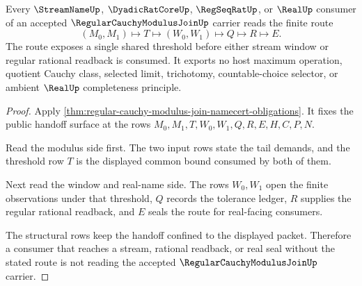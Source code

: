 \begin{theorem}
\label{thm:regular-cauchy-modulus-join-shared-tail-handoff}
Every $\StreamNameUp$, $\DyadicRatCoreUp$, $\RegSeqRatUp$, or $\RealUp$ consumer of an accepted $\RegularCauchyModulusJoinUp$ carrier reads the finite route
$$
(M_0,M_1) \longmapsto T \longmapsto (W_0,W_1) \longmapsto Q \longmapsto R \longmapsto E .
$$
The route exposes a single shared threshold before either stream window or regular rational readback is consumed. It exports no host maximum operation, quotient Cauchy class, selected limit, trichotomy, countable-choice selector, or ambient $\RealUp$ completeness principle.
\end{theorem}
\begin{proof}
Apply \autoref{thm:regular-cauchy-modulus-join-namecert-obligations}. It fixes the public handoff surface at the rows $M_0,M_1,T,W_0,W_1,Q,R,E,H,C,P,N$.

Read the modulus side first. The two input rows state the tail demands, and the threshold row $T$ is the displayed common bound consumed by both of them.

Next read the window and real-name side. The rows $W_0,W_1$ open the finite observations under that threshold, $Q$ records the tolerance ledger, $R$ supplies the regular rational readback, and $E$ seals the route for real-facing consumers.

The structural rows keep the handoff confined to the displayed packet. Therefore a consumer that reaches a stream, rational readback, or real seal without the stated route is not reading the accepted $\RegularCauchyModulusJoinUp$ carrier.
\end{proof}

